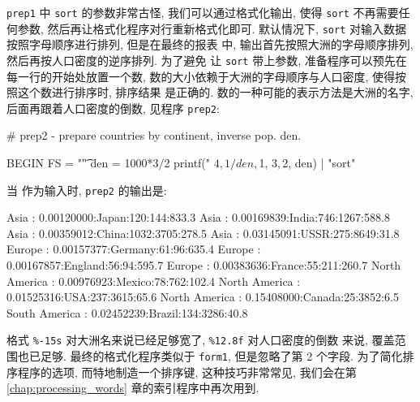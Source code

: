 \verb'prep1' 中 \verb'sort' 的参数非常古怪, 我们可以通过格式化输出, 使得
 \verb'sort' 不再需要任何参数, 然后再让格式化程序对行重新格式化即可.
默认情况下, \verb'sort' 对输入数据按照字母顺序进行排列, 但是在最终的报表
中, 输出首先按照大洲的字母顺序排列, 然后再按人口密度的逆序排列. 为了避免
让  \verb'sort' 带上参数, 准备程序可以预先在每一行的开始处放置一个数,
数的大小依赖于大洲的字母顺序与人口密度, 使得按照这个数进行排序时, 排序结果
是正确的. 数的一种可能的表示方法是大洲的名字, 后面再跟着人口密度的倒数,
见程序 \verb'prep2':
\begin{awkcode}
    # prep2 - prepare countries by continent, inverse pop. den.

    BEGIN { FS = "\t"}
          { den = 1000*$3/$2
            printf("%
                $4, 1/den, $1, $3, $2, den) | "sort"
          }
\end{awkcode}
当  作为输入时, \verb'prep2' 的输出是:
\begin{shell}
    Asia           :  0.00120000:Japan:120:144:833.3
    Asia           :  0.00169839:India:746:1267:588.8
    Asia           :  0.00359012:China:1032:3705:278.5
    Asia           :  0.03145091:USSR:275:8649:31.8
    Europe         :  0.00157377:Germany:61:96:635.4
    Europe         :  0.00167857:England:56:94:595.7
    Europe         :  0.00383636:France:55:211:260.7
    North America  :  0.00976923:Mexico:78:762:102.4
    North America  :  0.01525316:USA:237:3615:65.6
    North America  :  0.15408000:Canada:25:3852:6.5
    South America  :  0.02452239:Brazil:134:3286:40.8
\end{shell}
格式 \verb'%-15s' 对大洲名来说已经足够宽了, \verb'%12.8f' 对人口密度的倒数
来说, 覆盖范围也已足够. 最终的格式化程序类似于 \verb'form1', 但是忽略了第
2 个字段. 为了简化排序程序的选项, 而特地制造一个排序键, 这种技巧非常常见,
我们会在第 \ref{chap:processing_words} 章的索引程序中再次用到.

